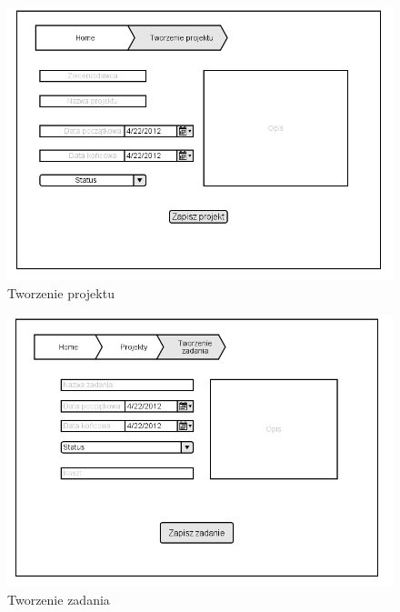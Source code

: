 \begin{figure}[H]
    \centering
    \includegraphics[scale=0.7]{diagramy/intefejsy/Tworzenie_projektu.png}
    \caption{Tworzenie projektu}
    \label{fig:usecase}
\end{figure}

\begin{figure}[H]
    \centering
    \includegraphics[scale=0.7]{diagramy/intefejsy/Tworzenie_zadania.png}
    \caption{Tworzenie zadania}
    \label{fig:usecase}
\end{figure}

